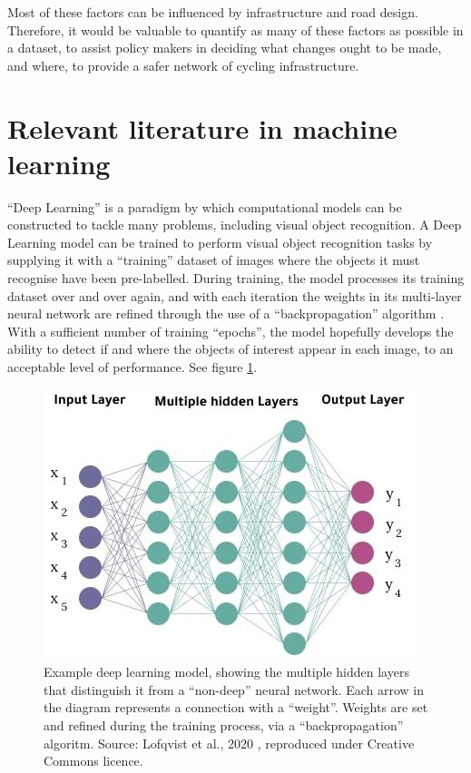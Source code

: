 \documentclass[11pt,twoside]{report}
\begin{document}
Most of these factors can be influenced by infrastructure and road design.  Therefore, it would be valuable to quantify as many of these factors as possible in a dataset, to assist policy makers in deciding what changes ought to be made, and where, to provide a safer network of cycling infrastructure.

\section{Relevant literature in machine learning}

``Deep Learning'' is a paradigm by which computational models can be constructed to tackle many problems, including visual object recognition.  A Deep Learning model can be trained to perform visual object recognition tasks by supplying it with a ``training'' dataset of images where the objects it must recognise have been pre-labelled.  During training, the model processes its training dataset over and over again, and with each iteration the weights in its multi-layer neural network are refined through the use of a ``backpropagation'' algorithm \cite{deeplearning}.  With a sufficient number of training ``epochs'', the model hopefully develops the ability to detect if and where the objects of interest appear in each image, to an acceptable level of performance.  See figure \ref{fig:deep_learning_diag}.

\begin{figure}[h]
\centering
\includegraphics[scale=0.60]{Deep-Neural-Network-with-multiple-hidden-layers.jpg}
\caption{Example deep learning model, showing the multiple hidden layers that distinguish it from a ``non-deep'' neural network.  Each arrow in the diagram represents a connection with a ``weight''.  Weights are set and refined during the training process, via a ``backpropagation'' algoritm.  Source: Lofqvist et al., 2020 \cite{diagram}, reproduced under Creative Commons licence.}
\label{fig:deep_learning_diag}
\end{figure}
\end{document}
